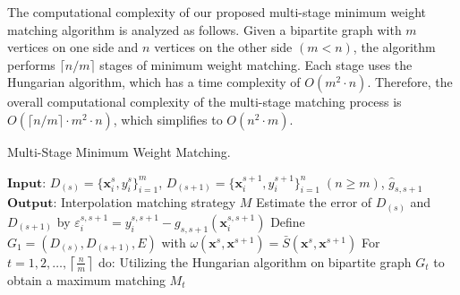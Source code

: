 \documentclass[final,3p,times]{elsarticle}
\begin{document}
{The computational complexity of our proposed multi-stage minimum weight matching algorithm is analyzed as follows. Given a bipartite graph with $m$ vertices on one side and $n$ vertices on the other side $(m < n)$, the algorithm performs $\lceil n / m \rceil$ stages of minimum weight matching. Each stage uses the Hungarian algorithm, which has a time complexity of $O(m^2 \cdot n)$. Therefore, the overall computational complexity of the multi-stage matching process is $O(\lceil n / m \rceil \cdot m^2 \cdot n)$, which simplifies to $O(n^2 \cdot m)$.}

\begin{algorithm}[t!]
  \caption{Multi-Stage Minimum Weight Matching.}\label{alg:alg2}
  \begin{algorithmic}
  \STATE 
  \STATE $\mathbf{Input}$: $D_{(s)}=\{\boldsymbol{x}_i^{s},y_i^s\}_{i=1}^m$, $D_{(s+1)}=\{\boldsymbol{x}_i^{s+1},y_i^{s+1}\}_{i=1}^n\;(n\ge m)$, $\hat{g}_{s,s+1}$
  \STATE $\mathbf{Output}$: Interpolation matching strategy $M$
  \vspace{5pt} %
  \STATE Estimate the error of $D_{(s)}$ and $D_{(s+1)}$ by {$\varepsilon_i^{s,s+1}=y_i^{s,s+1}-g_{s,s+1}(\boldsymbol{x}_i^
  {s,s+1})$}
  \STATE Define $G_1=(D_{(s)},D_{(s+1)},E)$ with $\omega(\boldsymbol{x}^{s},\boldsymbol{x}^{s+1})=\bar{S}(\boldsymbol{x}^{s},\boldsymbol{x}^{s+1})$
  \STATE For $t=1,2,\ldots,\left\lceil\frac{n}{m}\right\rceil$ do:
  \STATE \hspace{0.5cm}Utilizing the Hungarian algorithm on bipartite graph $G_t$ to obtain a maximum matching $M_t$
  \STATE {}

  \end{algorithmic}
  \label{Alg2}
\end{algorithm}
\end{document}
